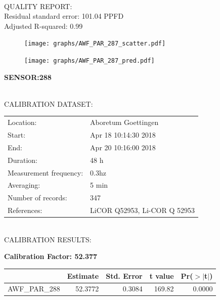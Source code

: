 \documentclass[oneside]{report}
\begin{document}
\hrulefill\\
QUALITY REPORT:\\
Residual standard error: 101.04 PPFD\\
Adjusted R-squared: 0.99



\begin{figure}[H]
  \centering
  \texttt{[image: graphs/AWF\_PAR\_287\_scatter.pdf]}
\end{figure}




\begin{figure}[H]
  \centering
  \texttt{[image: graphs/AWF\_PAR\_287\_pred.pdf]}
\end{figure}

\pagebreak


\begin{center}
\large{\textbf{SENSOR:288}}\\
\end{center}

\hrulefill\\
CALIBRATION DATASET:\\
\begin{table}[h!]
  \centering
  \label{tab:table1}
  \begin{tabular}{ll}
    Location: & Aboretum Goettingen\\ 
    
    
    Start:  & Apr 18 10:14:30 2018 \\
    End:   & Apr 20 10:16:00 2018\\ 
    Duration: & 48 h\\
    Measurement frequency: & 0.3hz\\
    Averaging:  &5 min\\
    Number of records: & 347 \\
    References: & LiCOR Q52953, Li-COR Q 52953 \\
  \end{tabular}
\end{table}

\hrulefill\\
CALIBRATION RESULTS:\\


\begin{center}
\textbf{\large{Calibration Factor: 52.377}}\\
\end{center}
\begin{table}[ht]
\centering
\begin{tabular}{rrrrr}
  \hline
 & Estimate & Std. Error & t value & Pr($>$$|$t$|$) \\ 
  \hline
AWF\_PAR\_288 & 52.3772 & 0.3084 & 169.82 & 0.0000 \\ 
   \hline
\end{tabular}
\end{table}
\end{document}
